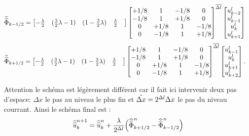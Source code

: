 \begin{align*}
    \widehat{\widehat{\Phi}}_{k-1/2}
        &=
    \begin{bmatrix}
        -\frac{\lambda}{2}&
        (\frac{3}{2} \lambda - 1)&
        (1 - \frac{3}{2} \lambda)&
        \frac{\lambda}{2}&
    \end{bmatrix}
    \begin{bmatrix}
        +1/8 & 1 & -1/8 & 0\\
        -1/8 & 1 & +1/8 & 0\\
        0 & +1/8 & 1 & -1/8\\
        0 & -1/8 & 1 & +1/8\\
    \end{bmatrix}^{{\overline{\Delta l}}}
    \begin{bmatrix}
        u^l_{k-2}\\
        u^l_{k-1}\\
        u^l_{k}\\
        u^l_{k+1}\\
    \end{bmatrix}
\end{align*}
\begin{align*}
    \widehat{\widehat{\Phi}}_{k+1/2}
        &=
    \begin{bmatrix}
        -\frac{\lambda}{2}&
        (\frac{3}{2} \lambda - 1)&
        (1 - \frac{3}{2} \lambda)&
        \frac{\lambda}{2}&
    \end{bmatrix}
    \begin{bmatrix}
        +1/8 & 1 & -1/8 & 0\\
        -1/8 & 1 & +1/8 & 0\\
        0 & +1/8 & 1 & -1/8\\
        0 & -1/8 & 1 & +1/8\\
    \end{bmatrix}^{{\overline{\Delta l}}}
    \begin{bmatrix}
        u^l_{k-1}\\
        u^l_{k}\\
        u^l_{k+1}\\
        u^l_{k+2}\\
    \end{bmatrix}.
\end{align*}

Attention le schéma est légèrement différent car il fait ici intervenir deux pas d'espace: $\Delta x$ le pas au niveau le plus fin
et $\Tilde {\Delta x} = 2^{\Delta l} \Delta x$ le pas du niveau courrant. Ainsi le schéma final est :
\begin{align}
    \widehat{\widehat{u}}^{n+1}_k = \widehat{\widehat{u}}^n_k + \frac{\lambda}{2^{\Delta l}} \Bigl( \widehat{\widehat{\Phi}}^n_{k+1/2} - \widehat{\widehat{\Phi}}^n_{k-1/2} \Bigr)
\end{align}